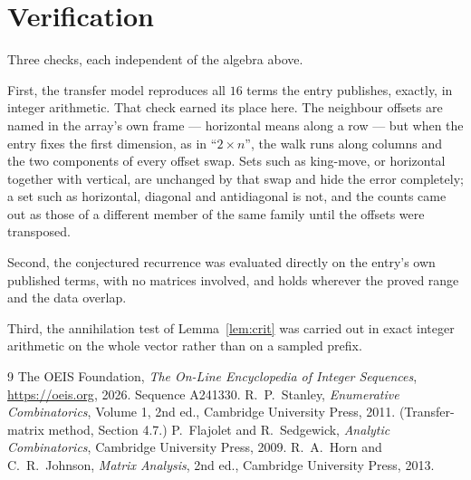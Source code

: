 \documentclass[11pt,a4paper]{article}
\theoremstyle{plain}
\theoremstyle{definition}
\begin{document}
\section{Verification}

Three checks, each independent of the algebra above.

First, the transfer model reproduces all $16$ terms the entry publishes, exactly, in
integer arithmetic. That check earned its place here. The neighbour offsets are named in the
array's own frame --- horizontal means along a row --- but when the entry fixes the first
dimension, as in ``$2\times n$'', the walk runs along columns and the two components of every
offset swap. Sets such as king-move, or horizontal together with vertical, are unchanged by
that swap and hide the error completely; a set such as horizontal, diagonal and antidiagonal
is not, and the counts came out as those of a different member of the same family until the
offsets were transposed.

Second, the conjectured recurrence was evaluated directly on the entry's own published terms,
with no matrices involved, and holds wherever the proved range and the data overlap.

Third, the annihilation test of Lemma~\ref{lem:crit} was carried out in exact integer
arithmetic on the whole vector rather than on a sampled prefix.

\begin{thebibliography}{9}
 The OEIS Foundation, \emph{The On-Line Encyclopedia of Integer
Sequences}, \url{https://oeis.org}, 2026. Sequence A241330.
 R.~P.~Stanley, \emph{Enumerative Combinatorics}, Volume 1, 2nd ed.,
Cambridge University Press, 2011. (Transfer-matrix method, Section 4.7.)
 P.~Flajolet and R.~Sedgewick, \emph{Analytic Combinatorics}, Cambridge
University Press, 2009.
 R.~A.~Horn and C.~R.~Johnson, \emph{Matrix Analysis}, 2nd ed., Cambridge
University Press, 2013.
\end{thebibliography}
\end{document}
